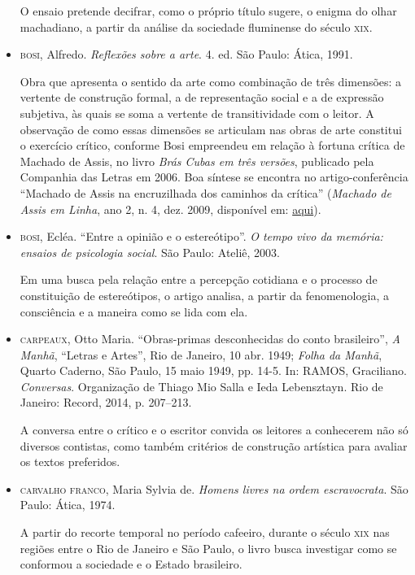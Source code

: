 \documentclass[11pt]{extarticle}
\begin{document}
\begin{itemize}
O ensaio pretende decifrar, como o próprio título sugere, o enigma do olhar machadiano, 
a partir da análise da sociedade fluminense do século \textsc{xix}.

\item  \textsc{bosi}, Alfredo. \emph{Reflexões sobre a arte}. 4. ed. São Paulo: Ática,
1991. 

Obra que apresenta o sentido da arte como combinação de três
dimensões: a vertente de construção formal, a de representação social e
a de expressão subjetiva, às quais se soma a vertente de transitividade
com o leitor. A observação de como essas dimensões se articulam nas
obras de arte constitui o exercício crítico, conforme Bosi empreendeu em
relação à fortuna crítica de Machado de Assis, no livro \emph{Brás Cubas
em três versões}, publicado pela Companhia das Letras em 2006. Boa
síntese se encontra no artigo-conferência ``Machado de Assis na
encruzilhada dos caminhos da crítica'' (\emph{Machado de Assis em
Linha}, ano 2, n. 4, dez. 2009, disponível em:
\href{http://machadodeassis.net/download/numero04/num04artigo02.pdf}{aqui}).

\item  \textsc{bosi}, Ecléa. ``Entre a opinião e o estereótipo''. \emph{O tempo vivo da
memória: ensaios de psicologia social}. São Paulo: Ateliê, 2003.

Em uma busca pela relação entre a percepção cotidiana e o processo de constituição de 
estereótipos, o artigo analisa, a partir da fenomenologia, a consciência e a maneira 
como se lida com ela.

\item  \textsc{carpeaux}, Otto Maria. ``Obras-primas desconhecidas do conto
brasileiro'', \emph{A Manhã}, ``Letras e Artes'', Rio de Janeiro, 10
abr. 1949; \emph{Folha da Manhã}, Quarto Caderno, São Paulo, 15 maio
1949, pp. 14-5. In: RAMOS, Graciliano. \emph{Conversas}. Organização de
Thiago Mio Salla e Ieda Lebensztayn. Rio de Janeiro: Record, 2014, p.
207--213. 

A conversa entre o crítico e o escritor convida os leitores a
conhecerem não só diversos contistas, como também critérios de
construção artística para avaliar os textos preferidos.

\item  \textsc{carvalho franco}, Maria Sylvia de. \emph{Homens livres na ordem
escravocrata}. São Paulo: Ática, 1974.

A partir do recorte temporal no período cafeeiro, durante o século \textsc{xix} 
nas regiões entre o Rio de Janeiro e São Paulo, o livro busca investigar como 
se conformou a sociedade e o Estado brasileiro. 


\end{itemize}
\end{document}
